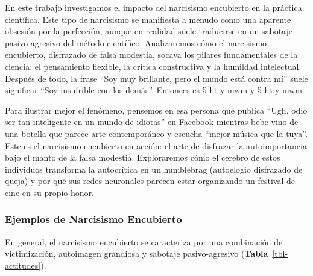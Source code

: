 \documentclass[
  10pt]{article}
\begin{document}
En este trabajo investigamos el impacto del narcisismo encubierto en la
práctica científica. Este tipo de narcisismo se manifiesta a menudo como
una aparente obsesión por la perfección, aunque en realidad suele
traducirse en un sabotaje pasivo-agresivo del método científico.
Analizaremos cómo el narcisismo encubierto, disfrazado de falsa
modestia, socava los pilares fundamentales de la ciencia: el pensamiento
flexible, la crítica constructiva y la humildad intelectual. Después de
todo, la frase ``Soy muy brillante, pero el mundo está contra mí'' suele
significar ``Soy insufrible con los demás''. Entonces es \ac{5-ht} y
\ac{mwm} y \ac{5-ht} y \ac{mwm}.

Para ilustrar mejor el fenómeno, pensemos en esa persona que publica
``Ugh, odio ser tan inteligente en un mundo de idiotas'' en Facebook
mientras bebe vino de una botella que parece arte contemporáneo y
escucha ``mejor música que la tuya''. Este es el narcisismo encubierto
en acción: el arte de disfrazar la autoimportancia bajo el manto de la
falsa modestia. Exploraremos cómo el cerebro de estos individuos
transforma la autocrítica en un humblebrag (autoelogio disfrazado de
queja) y por qué sus redes neuronales parecen estar organizando un
festival de cine en su propio honor.

\subsubsection{Ejemplos de Narcisismo
Encubierto}\label{ejemplos-de-narcisismo-encubierto}

En general, el narcisismo encubierto se caracteriza por una combinación
de victimización, autoimagen grandiosa y sabotaje pasivo-agresivo
(\textbf{Tabla}~\ref{tbl-actitudes}).
\end{document}

